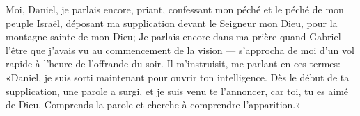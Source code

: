 Moi, Daniel, je parlais encore,
	priant, confessant mon péché et le péché de mon peuple Israël,
	déposant ma supplication devant le Seigneur mon Dieu,
	pour la montagne sainte de mon Dieu;
Je parlais encore dans ma prière quand Gabriel
	--- l’être que j’avais vu au commencement de la vision ---
	s’approcha de moi d’un vol rapide à l’heure de l’offrande du soir.
Il m’instruisit, me parlant en ces termes:
	«Daniel, je suis sorti maintenant pour ouvrir ton intelligence.
Dès le début de ta supplication, une parole a surgi, et je suis venu te l’annoncer,
	car toi, tu es aimé de Dieu.
Comprends la parole et cherche à comprendre l’apparition.»
